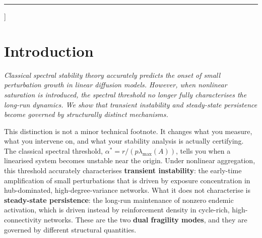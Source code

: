 \documentclass[10pt,twocolumn]{article}
\theoremstyle{myproof}
\newcommand{\lmax}{\lambda_{\max}}
\begin{document}
{\begin{@twocolumnfalse}
\begin{mdframed}[backgroundcolor=lightblue!40,linecolor=navyblue,linewidth=0.6pt,
  innerleftmargin=8pt,innerrightmargin=8pt,innertopmargin=6pt,innerbottommargin=6pt,
  roundcorner=3pt]
\vspace{4pt}
\end{mdframed}
\vspace{6pt}\noindent\color{navyblue}\rule{\textwidth}{0.5pt}\vspace{8pt}
\end{@twocolumnfalse}}]


\section{Introduction}
\label{sec:intro}

\emph{Classical spectral stability theory accurately predicts the onset of small perturbation
growth in linear diffusion models. However, when nonlinear saturation is introduced, the spectral
threshold no longer fully characterises the long-run dynamics. We show that transient instability
and steady-state persistence become governed by structurally distinct mechanisms.}

This distinction is not a minor technical footnote. It changes what you measure, what you
intervene on, and what your stability analysis is actually certifying. The classical spectral
threshold, $\alpha^* = r / (p\lmax(A))$, tells you when a linearised system becomes unstable near
the origin. Under nonlinear aggregation, this threshold accurately characterises
\textbf{transient instability}: the early-time amplification of small perturbations that is driven
by exposure concentration in hub-dominated, high-degree-variance networks. What it does not
characterise is \textbf{steady-state persistence}: the long-run maintenance of nonzero endemic
activation, which is driven instead by reinforcement density in cycle-rich, high-connectivity
networks. These are the two \textbf{dual fragility modes}, and they are governed by different
structural quantities.
\end{document}
